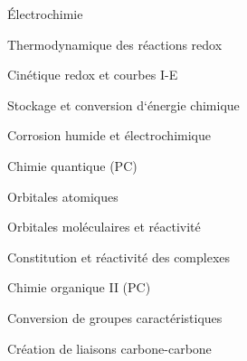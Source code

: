 \begin{multicols}{2}
\begin{programme}
    \item Électrochimie
         \begin{programme}
                \item Thermodynamique des réactions redox
                \item Cinétique redox et courbes I-E
                \item Stockage et conversion d‘énergie chimique
                \item Corrosion humide et électrochimique
            \end{programme}
    \item Chimie quantique (PC)
        \begin{programme}
                \item Orbitales atomiques
                \item Orbitales moléculaires et réactivité
                \item Constitution et réactivité des complexes
        \end{programme}
    \item Chimie organique II (PC)
        \begin{programme}
                \item Conversion de groupes caractéristiques
                \item Création de liaisons carbone-carbone
        \end{programme}
\end{programme}
\end{multicols}

\newpage

\listofexercises

\newpage

\printindex

\mainmatter

\newpage